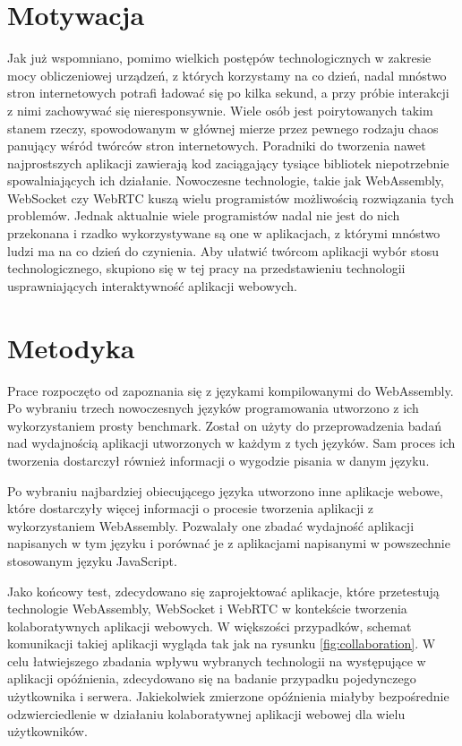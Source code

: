 \documentclass[language=polish,type=master]{aghmodern}
\begin{document}
\clearpage

\section{Motywacja}
Jak już wspomniano, pomimo wielkich postępów technologicznych w zakresie mocy obliczeniowej urządzeń, z których korzystamy na co dzień, nadal mnóstwo stron internetowych potrafi ładować się po kilka sekund, a przy próbie interakcji z nimi zachowywać się nieresponsywnie.
Wiele osób jest poirytowanych takim stanem rzeczy, spowodowanym w głównej mierze przez pewnego rodzaju chaos panujący wśród twórców stron internetowych.
Poradniki do tworzenia nawet najprostszych aplikacji zawierają kod zaciągający tysiące bibliotek niepotrzebnie spowalniających ich działanie.
Nowoczesne technologie, takie jak WebAssembly, WebSocket czy WebRTC kuszą wielu programistów możliwością rozwiązania tych problemów.
Jednak aktualnie wiele programistów nadal nie jest do nich przekonana i rzadko wykorzystywane są one w aplikacjach, z którymi mnóstwo ludzi ma na co dzień do czynienia.
Aby ułatwić twórcom aplikacji wybór stosu technologicznego, skupiono się w tej pracy na przedstawieniu technologii usprawniających interaktywność aplikacji webowych.

\section{Metodyka}
Prace rozpoczęto od zapoznania się z językami kompilowanymi do WebAssembly.
Po wybraniu trzech nowoczesnych języków programowania utworzono z ich wykorzystaniem prosty benchmark.
Został on użyty do przeprowadzenia badań nad wydajnością aplikacji utworzonych w każdym z tych języków.
Sam proces ich tworzenia dostarczył również informacji o wygodzie pisania w danym języku.

Po wybraniu najbardziej obiecującego języka utworzono inne aplikacje webowe, które dostarczyły więcej informacji o procesie tworzenia aplikacji z wykorzystaniem WebAssembly.
Pozwalały one zbadać wydajność aplikacji napisanych w tym języku i porównać je z aplikacjami napisanymi w powszechnie stosowanym języku JavaScript.

Jako końcowy test, zdecydowano się zaprojektować aplikacje, które przetestują technologie WebAssembly, WebSocket i WebRTC w kontekście tworzenia kolaboratywnych aplikacji webowych.
W większości przypadków, schemat komunikacji takiej aplikacji wygląda tak jak na rysunku \ref{fig:collaboration}.
W celu łatwiejszego zbadania wpływu wybranych technologii na występujące w aplikacji opóźnienia, zdecydowano się na badanie przypadku pojedynczego użytkownika i serwera.
Jakiekolwiek zmierzone opóźnienia miałyby bezpośrednie odzwierciedlenie w działaniu kolaboratywnej aplikacji webowej dla wielu użytkowników.
\end{document}

